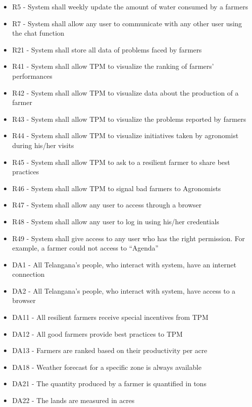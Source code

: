 \begin{enumerate}[label=\textbf{G.\arabic*}]
\begin{enumerate} [label=\textbf{G.4.\arabic*}]
\begin{itemize} [label =]
            \item R5 - System shall weekly update the amount of water consumed by a farmers 
            \item R7 - System shall allow any user to communicate with any other user using the chat function
            \item R21 - System shall store all data of problems faced by farmers
            \item R41 - System shall allow TPM to visualize the ranking of farmers’ performances
            \item R42 - System shall allow TPM to visualize data about the production of a farmer
            \item R43 - System shall allow TPM to visualize the problems reported by farmers
            \item R44 - System shall allow TPM to visualize initiatives taken by agronomist during his/her visits
            \item R45 - System shall allow TPM to ask to a resilient farmer to share best practices
            \item R46 - System shall allow TPM to signal bad farmers to Agronomists
            \item R47 - System shall allow any user to access through a browser
            \item R48 - System shall allow any user to log in using his/her credentials
            \item R49 - System shall give access to any user who has the right permission. For example, a farmer could not access to “Agenda”
            \item DA1 - All Telangana’s people, who interact with system, have an internet connection
            \item DA2 - All Telangana’s people, who interact with system, have access to a browser
            \item DA11 - All resilient farmers receive special incentives from TPM
            \item DA12 - All good farmers provide best practices to TPM
            \item DA13 - Farmers are ranked based on their productivity per acre
            \item DA18 - Weather forecast for a specific zone is always available
            \item DA21 - The quantity produced by a farmer is quantified in tons
            \item DA22 - The lands are measured in acres

\end{itemize}
\end{enumerate}
\end{enumerate}
